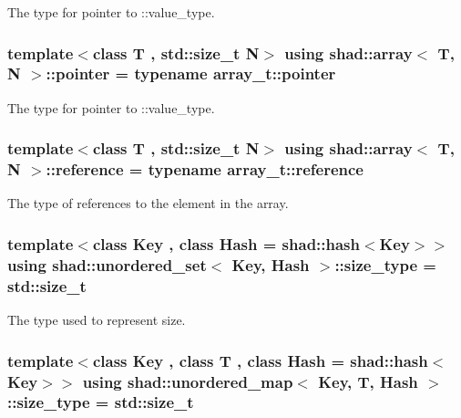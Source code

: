 The type for pointer to \-::value\-\_\-type. 

\hypertarget{group__Types_gadfa9e253e7692c86d9fa4386cebf9459}{
\subsubsection[{pointer}]{\setlength{\rightskip}{0pt plus 5cm}template$<$class T , std\-::size\-\_\-t N$>$ using {\bf shad\-::array}$<$ T, N $>$\-::pointer =  typename array\-\_\-t\-::pointer}}\label{group__Types_gadfa9e253e7692c86d9fa4386cebf9459}


The type for pointer to \-::value\-\_\-type. 

\hypertarget{group__Types_gad3f7e8f8130d2cfb3b554c72f9f29c57}{
\subsubsection[{reference}]{\setlength{\rightskip}{0pt plus 5cm}template$<$class T , std\-::size\-\_\-t N$>$ using {\bf shad\-::array}$<$ T, N $>$\-::reference =  typename array\-\_\-t\-::reference}}\label{group__Types_gad3f7e8f8130d2cfb3b554c72f9f29c57}


The type of references to the element in the array. 

\hypertarget{group__Types_gaf733341726e3097cf440257afa76d76a}{
\subsubsection[{size\-\_\-type}]{\setlength{\rightskip}{0pt plus 5cm}template$<$class Key , class Hash  = shad\-::hash$<$\-Key$>$$>$ using {\bf shad\-::unordered\-\_\-set}$<$ Key, Hash $>$\-::size\-\_\-type =  std\-::size\-\_\-t}}\label{group__Types_gaf733341726e3097cf440257afa76d76a}


The type used to represent size. 

\hypertarget{group__Types_ga2a84980e6d435a8a7b1a99f78b828a65}{
\subsubsection[{size\-\_\-type}]{\setlength{\rightskip}{0pt plus 5cm}template$<$class Key , class T , class Hash  = shad\-::hash$<$\-Key$>$$>$ using {\bf shad\-::unordered\-\_\-map}$<$ Key, T, Hash $>$\-::size\-\_\-type =  std\-::size\-\_\-t}}\label{group__Types_ga2a84980e6d435a8a7b1a99f78b828a65}



